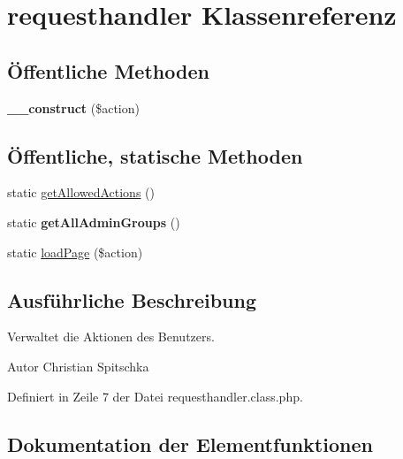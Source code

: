 \hypertarget{classrequesthandler}{}\section{requesthandler Klassenreferenz}
\label{classrequesthandler}
\subsection*{Öffentliche Methoden}
\begin{DoxyCompactItemize}
\item 
\mbox{\label{classrequesthandler_aa046ac8e17b1a421352cd4bb7094ad69}} 
{\bfseries \+\_\+\+\_\+construct} (\$action)
\end{DoxyCompactItemize}
\subsection*{Öffentliche, statische Methoden}
\begin{DoxyCompactItemize}
\item 
static \mbox{\hyperlink{classrequesthandler_acf79bcecac12829932dd9a0f23da115c}{get\+Allowed\+Actions}} ()
\item 
\mbox{\label{classrequesthandler_a6ca8738218db590aad1c72dc8fd42dcc}} 
static {\bfseries get\+All\+Admin\+Groups} ()
\item 
static \mbox{\hyperlink{classrequesthandler_ab52a1d35d421a292eff1e78c33bfc225}{load\+Page}} (\$action)
\end{DoxyCompactItemize}


\subsection{Ausführliche Beschreibung}
Verwaltet die Aktionen des Benutzers. \begin{DoxyAuthor}{Autor}
Christian Spitschka 
\end{DoxyAuthor}


Definiert in Zeile 7 der Datei requesthandler.\+class.\+php.



\subsection{Dokumentation der Elementfunktionen}
\mbox{\label{classrequesthandler_acf79bcecac12829932dd9a0f23da115c}} 
